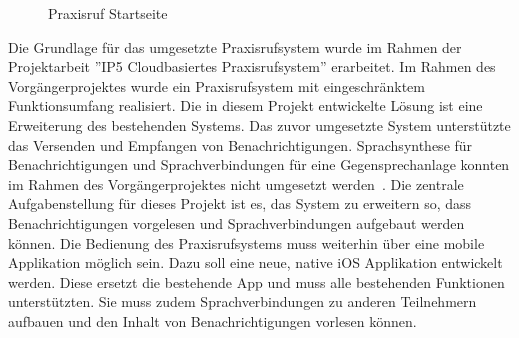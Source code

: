 \begin{figure}[h]
    \centering
    \begin{minipage}[b]{0.95\textwidth}
        \caption{Praxisruf Startseite}
    \end{minipage}
    \label{fig:AdminUI-Introduction}
\end{figure}

Die Grundlage für das umgesetzte Praxisrufsystem wurde im Rahmen der Projektarbeit ''IP5 Cloudbasiertes Praxisrufsystem'' erarbeitet.
Im Rahmen des Vorgängerprojektes wurde ein Praxisrufsystem mit eingeschränktem Funktionsumfang realisiert.
Die in diesem Projekt entwickelte Lösung ist eine Erweiterung des bestehenden Systems.
Das zuvor umgesetzte System unterstützte das Versenden und Empfangen von Benachrichtigungen.
Sprachsynthese für Benachrichtigungen und Sprachverbindungen für eine Gegensprechanlage konnten im Rahmen des Vorgängerprojektes nicht umgesetzt werden~\cite{ip5}.
Die zentrale Aufgabenstellung für dieses Projekt ist es, das System zu erweitern so, dass Benachrichtigungen vorgelesen und Sprachverbindungen aufgebaut werden können.
Die Bedienung des Praxisrufsystems muss weiterhin über eine mobile Applikation möglich sein.
Dazu soll eine neue, native iOS Applikation entwickelt werden.
Diese ersetzt die bestehende App und muss alle bestehenden Funktionen unterstützten.
Sie muss zudem Sprachverbindungen zu anderen Teilnehmern aufbauen und den Inhalt von Benachrichtigungen vorlesen können.

